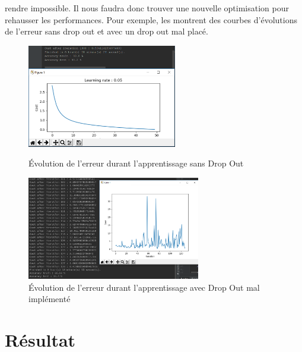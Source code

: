 \documentclass[12pt,a4paper]{extarticle}
\begin{document}
rendre impossible. Il nous faudra donc trouver une nouvelle optimisation pour rehausser les performances. Pour exemple, les  montrent des courbes d'évolutions de l'erreur sans drop out et avec un drop out mal placé. \\

\begin{figure}[h]
    \begin{minipage}[c]{.46\linewidth}
        \centering
        \includegraphics[height=4.5cm]{Perfect}
        \caption{Évolution de l'erreur durant l'apprentissage sans Drop Out}
    \end{minipage}
    \hfill%
    \begin{minipage}[c]{.46\linewidth}
        \centering
        \includegraphics[height=4.5cm]{drop_out_de_merde}
        \caption{Évolution de l'erreur durant l'apprentissage avec Drop Out mal implémenté }
    \end{minipage}
\end{figure}

 
\section{Résultat}
\end{document}
